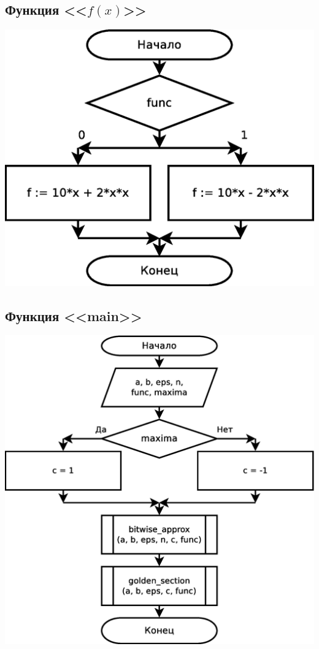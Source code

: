 \documentclass[a4paper]{article}
\begin{document}
\subsection{Функция <<$f(x)$>>}
\includegraphics[scale=0.35]{schemes/f}

\subsection{Функция <<main>>}
\includegraphics[scale=0.35]{schemes/main}
\end{document}
